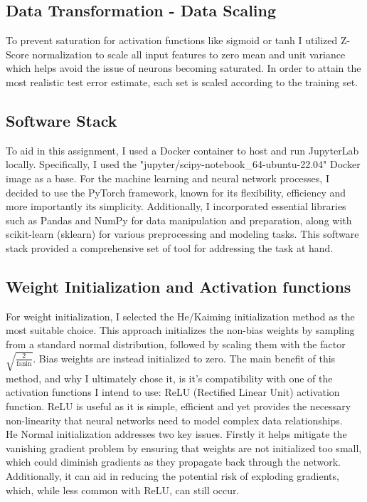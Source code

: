 \documentclass[conference]{IEEEtran}
\begin{document}
\subsection{Data Transformation - Data Scaling}
To prevent saturation for activation functions like sigmoid or tanh I utilized Z-Score normalization to scale all input features to zero mean and unit variance which helps avoid the issue of neurons becoming saturated. In order to attain the most realistic test error estimate, each set is scaled according to the training set.

\subsection{Software Stack}
To aid in this assignment, I used a Docker container to host and run JupyterLab locally. Specifically, I used the "jupyter/scipy-notebook\_64-ubuntu-22.04" Docker image as a base. For the machine learning and neural network processes, I decided to use the PyTorch framework, known for its flexibility, efficiency and more importantly its simplicity. Additionally, I incorporated essential libraries such as Pandas and NumPy for data manipulation and preparation, along with scikit-learn (sklearn) for various preprocessing and modeling tasks. This software stack provided a comprehensive set of tool for addressing the task at hand.

\subsection{Weight Initialization and Activation functions}
For weight initialization, I selected the He/Kaiming initialization method \cite{He_2015_ICCV} as the most suitable choice. This approach initializes the non-bias weights by sampling from a standard normal distribution, followed by scaling them with the factor \( \sqrt{\frac{2}{\text{fanin}}} \). Bias weights are instead initialized to zero. The main benefit of this method, and why I ultimately chose it, is it's compatibility with one of the activation functions I intend to use: ReLU (Rectified Linear Unit) activation function. ReLU is useful as it is simple, efficient and yet provides the necessary non-linearity that neural networks need to model complex data relationships. \\

He Normal initialization addresses two key issues. Firstly it helps mitigate the vanishing gradient problem by ensuring that weights are not initialized too small, which could diminish gradients as they propagate back through the network. Additionally, it can aid in reducing the potential risk of exploding gradients, which, while less common with ReLU, can still occur.
\end{document}

